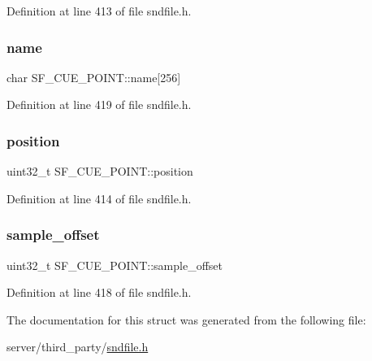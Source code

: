 Definition at line 413 of file sndfile.\+h.

\mbox{\label{struct_s_f___c_u_e___p_o_i_n_t_a3af76532a14733e8b2d7c2b0aa44f391}} 
\subsubsection{\texorpdfstring{name}{name}}
{\footnotesize\ttfamily char S\+F\+\_\+\+C\+U\+E\+\_\+\+P\+O\+I\+N\+T\+::name\mbox{[}256\mbox{]}}



Definition at line 419 of file sndfile.\+h.

\mbox{\label{struct_s_f___c_u_e___p_o_i_n_t_af0a14e4da226c10b521028391a250dc7}} 
\subsubsection{\texorpdfstring{position}{position}}
{\footnotesize\ttfamily uint32\+\_\+t S\+F\+\_\+\+C\+U\+E\+\_\+\+P\+O\+I\+N\+T\+::position}



Definition at line 414 of file sndfile.\+h.

\mbox{\label{struct_s_f___c_u_e___p_o_i_n_t_afa1b5db3843a2ad586e20d92bd18ae53}} 
\subsubsection{\texorpdfstring{sample\_offset}{sample\_offset}}
{\footnotesize\ttfamily uint32\+\_\+t S\+F\+\_\+\+C\+U\+E\+\_\+\+P\+O\+I\+N\+T\+::sample\+\_\+offset}



Definition at line 418 of file sndfile.\+h.



The documentation for this struct was generated from the following file\+:\begin{DoxyCompactItemize}
\item 
server/third\+\_\+party/\mbox{\hyperlink{sndfile_8h}{sndfile.\+h}}\end{DoxyCompactItemize}
